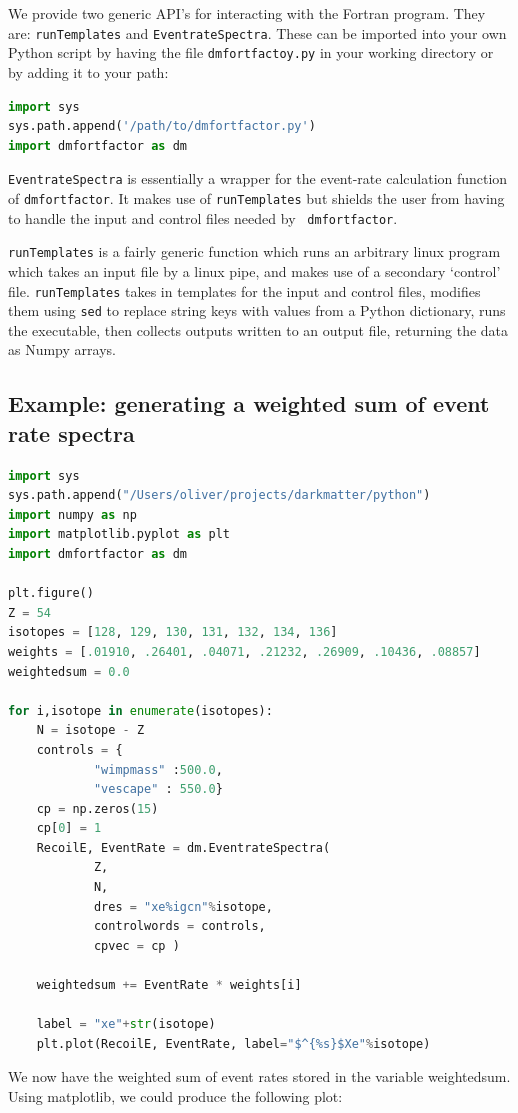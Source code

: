 \documentclass[
14pt, %
a4paper, %
oneside, %
headinclude,footinclude, %
BCOR5mm, %
]{scrartcl}
\begin{document}
We provide two generic API's for interacting with the Fortran program. They are:
{\tt runTemplates} and {\tt EventrateSpectra}.  These can be imported into your
own Python script by having the file {\tt dmfortfactoy.py} in your working
directory or by adding it to your path:
\begin{lstlisting}[language=Python]
import sys
sys.path.append('/path/to/dmfortfactor.py')
import dmfortfactor as dm
\end{lstlisting}

{\tt EventrateSpectra} is essentially a wrapper for the event-rate calculation
function of {\tt dmfortfactor}. It makes use of {\tt runTemplates} but shields
the user from having to handle the input and control files needed by {\tt
dmfortfactor}.

{\tt runTemplates} is a fairly generic function which runs an arbitrary linux
program which takes an input file by a linux pipe, and makes use of a secondary
`control' file. {\tt runTemplates} takes in templates for the input and control
files, modifies them using {\tt sed} to replace string keys with values from a
Python dictionary, runs the executable, then collects outputs written to an
output file, returning the data as Numpy arrays.

\subsection{Example: generating a weighted sum of event rate spectra}

\begin{lstlisting}[language=python]
import sys
sys.path.append("/Users/oliver/projects/darkmatter/python")
import numpy as np
import matplotlib.pyplot as plt
import dmfortfactor as dm

plt.figure()
Z = 54
isotopes = [128, 129, 130, 131, 132, 134, 136]
weights = [.01910, .26401, .04071, .21232, .26909, .10436, .08857]
weightedsum = 0.0

for i,isotope in enumerate(isotopes):
    N = isotope - Z
    controls = {
            "wimpmass" :500.0,
            "vescape" : 550.0}
    cp = np.zeros(15)
    cp[0] = 1
    RecoilE, EventRate = dm.EventrateSpectra(
            Z,
            N,
            dres = "xe%igcn"%isotope,
            controlwords = controls,
            cpvec = cp )

    weightedsum += EventRate * weights[i]

    label = "xe"+str(isotope)
    plt.plot(RecoilE, EventRate, label="$^{%s}$Xe"%isotope)
\end{lstlisting}
We now have the weighted sum of event rates stored in the variable weightedsum.
Using matplotlib, we could produce the following plot:
\end{document}
